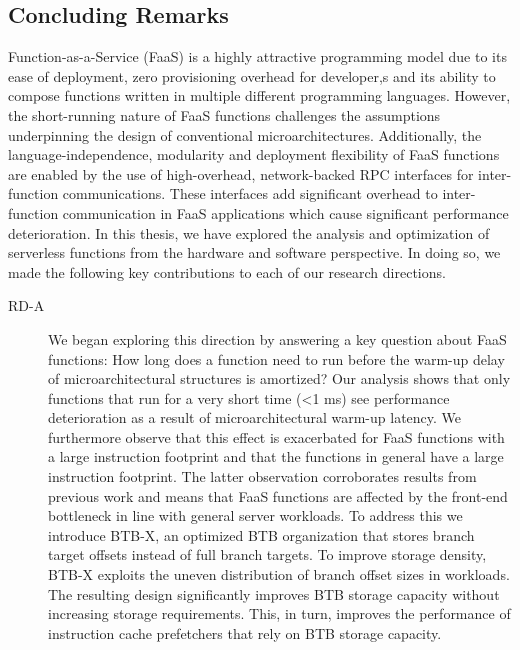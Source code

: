 \documentclass[../main.tex]{subfiles}
\begin{document}
\ifx\chapincluded\undefined
  \begin{refsection}
 \fi

\chapter{Concluding Remarks}
\label{chap:conclusions}
Function-as-a-Service (FaaS) is a highly attractive programming model
due to its ease of deployment, zero provisioning overhead for
developer,s and its ability to compose functions written in multiple
different programming languages. However, the short-running nature of
FaaS functions challenges the assumptions underpinning the design of
conventional microarchitectures. Additionally, the
language-independence, modularity and deployment flexibility of FaaS
functions are enabled by the use of high-overhead, network-backed RPC
interfaces for inter-function communications. These interfaces add
significant overhead to inter-function communication in FaaS
applications which cause significant performance deterioration. In
this thesis, we have explored the analysis and optimization of
serverless functions from the hardware and software perspective. In
doing so, we made the following key contributions to each of our
research directions.

\begin{description}

  
\item[RD-A] We began exploring this direction by answering a key
  question about FaaS functions: How long does a function need to run
  before the warm-up delay of microarchitectural structures is
  amortized? Our analysis shows that only functions that run for a very
  short time (<1 ms) see performance deterioration as a result of
  microarchitectural warm-up latency. We furthermore observe that this
  effect is exacerbated for FaaS functions with a large instruction
  footprint and that the functions in general have a large instruction
  footprint. The latter observation corroborates results from previous
  work and means that FaaS functions are affected by the front-end
  bottleneck in line with general server workloads. To address this we
  introduce BTB-X, an optimized BTB organization that stores branch
  target offsets instead of full branch targets. To improve storage
  density, BTB-X exploits the uneven distribution of branch offset
  sizes in workloads. The resulting design significantly improves BTB
  storage capacity without increasing storage requirements. This, in
  turn, improves the performance of instruction cache prefetchers that
  rely on BTB storage capacity.


\end{description}
\end{refsection}
\end{document}
